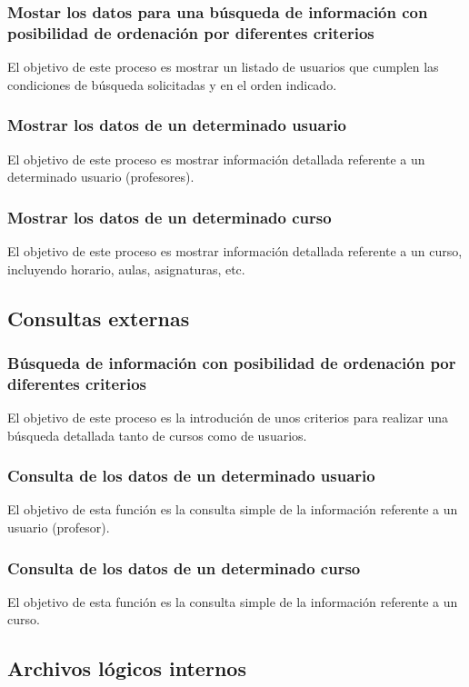 \documentclass[11pt,a4paper,spanish,twoside]{book}
\begin{document}
\subsubsection{Mostar los datos para una búsqueda de información con
posibilidad de ordenación por diferentes criterios}
El objetivo de este proceso es mostrar un listado de usuarios que cumplen las
condiciones de búsqueda solicitadas y en el orden indicado.

\subsubsection{Mostrar los datos de un determinado usuario}
El objetivo de este proceso es mostrar información detallada referente a un
determinado usuario (profesores).

\subsubsection{Mostrar los datos de un determinado curso}
El objetivo de este proceso es mostrar información detallada referente a un
curso, incluyendo horario, aulas, asignaturas, etc.

\subsection{Consultas externas}
\subsubsection{Búsqueda de información con posibilidad de ordenación por
  diferentes criterios}
El objetivo de este proceso es la introdución de unos criterios para realizar 
una búsqueda detallada tanto de cursos como de usuarios.

\subsubsection{Consulta de los datos de un determinado usuario}
El objetivo de esta función es la consulta simple de la información referente
a un usuario (profesor).

\subsubsection{Consulta de los datos de un determinado curso}
El objetivo de esta función es la consulta simple de la información referente
a un curso.

\subsection{Archivos lógicos internos}
\end{document}
